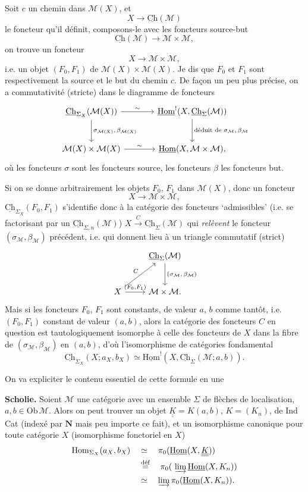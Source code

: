 \documentclass[11pt]{article}
\newcommand{\printedpage}[1]{\marginpar{\footnotesize p.~#1}}
\newcommand{\msp}[1]{\marginpar{\footnotesize [#1]}}
\newcommand{\uHom}{\underline{\mathrm{Hom}}}
\newcommand{\Ch}{\underline{\mathrm{Ch}}}
\newcommand{\cM}{\mathcal{M}}
\newcommand{\KK}{\underline{\underline{K}}}
\newcommand{\dfeq}{\overset{\text{déf}}{=}}
\begin{document}
\msp{page 31}
Soit $c$ un chemin dans $\cM(X)$, et
\[
X\longrightarrow\Ch(\cM)
\]
le foncteur qu'il définit, composons-le avec les foncteurs source-but
\[
\Ch(\cM)\longrightarrow\cM\times\cM,
\]
on trouve un foncteur
\[
X\longrightarrow\cM\times\cM,
\]
i.e. un objet $(F_0,F_1)$ de $\cM(X)\times\cM(X)$. Je dis que $F_0$ et $F_1$ sont respectivement la source et le but du chemin $c$. De façon un peu plus précise, on a commutativité (stricte) dans le diagramme de foncteurs
\printedpage{20}
\[
\begin{tikzcd}[column sep=large, row sep=large]
\Ch_{\Sigma_X}(\cM(X)) \arrow[r, "\sim"] \arrow[d, "{\sigma_{\cM(X)},\,\beta_{\cM(X)}}"] & \uHom^{!}(X,\Ch_{\Sigma}(\cM)) \arrow[d, "{\text{déduit de }\sigma_{\cM},\,\beta_{\cM}}"] \\
\cM(X)\times\cM(X) \arrow[r, "\sim"] & \uHom(X,\cM\times\cM),
\end{tikzcd}
\]
où les foncteurs $\sigma$ sont les foncteurs source, les foncteurs $\beta$ les foncteurs but.

Si on se donne arbitrairement les objets $F_0$, $F_1$ dans $\cM(X)$, donc un foncteur
\[
X\longrightarrow\cM\times\cM,
\]
$\Ch_{\Sigma_X}(F_0,F_1)$ s'identifie donc à la catégorie des foncteurs ‘admissibles’ (i.e. se factorisant par un $\Ch_{\Sigma,n}(\cM)$) $X\xrightarrow{\ C\ }\Ch_{\Sigma}(\cM)$ qui \textit{relèvent}
\msp{page 32: blank}
\msp{page 33}
le foncteur $(\sigma_{\cM},\beta_{\cM})$ précédent, i.e. qui donnent lieu à un triangle commutatif (strict)
\[
\begin{tikzcd}[row sep=large]
 & \Ch_{\Sigma}(\cM) \arrow[d, "{(\sigma_{\cM},\,\beta_{\cM})}"] \\
X \arrow[ur, "C"] \arrow[r, "{(F_0,F_1)}"] & \cM\times\cM.
\end{tikzcd}
\]
Mais si les foncteurs $F_0$, $F_1$ sont constants, de valeur $a$, $b$ comme tantôt, i.e. $(F_0,F_1)$ constant de valeur $(a,b)$, alors la catégorie des foncteurs $C$ en question est tautologiquement isomorphe à celle des foncteurs de $X$ dans la fibre de $(\sigma_{\cM},\beta_{\cM})$ en $(a,b)$, d'où l'isomorphisme de catégories fondamental
\[
\boxed{\Ch_{\Sigma_X}(X;a_X,b_X)\simeq\uHom^{!}(X,\Ch_{\Sigma}(\cM;a,b)).}
\]

On va expliciter le contenu essentiel de cette formule en une

\textbf{Scholie.} Soient $\cM$ une catégorie avec un ensemble $\Sigma$ de flèches de localisation, $a,b\in\mathrm{Ob}\,\cM$. Alors on peut trouver un objet $\KK=K(a,b)$, $K=(K_n)$, de Ind\,Cat (indexé par $\mathbf{N}$ mais peu importe ce fait), et un isomorphisme canonique pour toute catégorie $X$ (isomorphisme fonctoriel en $X$)
\[
\begin{aligned}
\mathrm{Hom}_{\Sigma_X}(a_X,b_X) \quad &\simeq \quad \pi_0(\uHom(X,\KK)) \\
&\dfeq \quad \pi_0(\ \varinjlim \uHom(X,K_n)) \\
&\simeq \quad \varinjlim \pi_0(\uHom(X,K_n)).
\end{aligned}
\]
\end{document}
